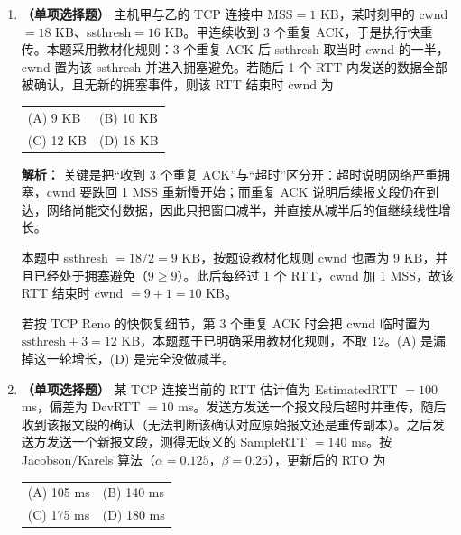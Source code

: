 \begin{enumerate}
\ifshowsolutions\par\noindent\textbf{解析：} 逐项辨析：
(A) 错。服务器收到 SYN 后发回 SYN+ACK 并进入 \texttt{SYN-RCVD}，只有收到第三次握手的 ACK 才进入 \texttt{ESTABLISHED}。
(B) 错。主动关闭方发出 FIN 后进入 \texttt{FIN-WAIT-1}，收到对方的 ACK 后才进入 \texttt{FIN-WAIT-2}。
(C) 对。第三次握手的报文段 ACK=1，此时客户端已认为连接建立，可以携带数据；数据字节按字节消耗序号（若只发纯 ACK，则不消耗序号）。
(D) 错。\texttt{TIME-WAIT} 由\textbf{主动}关闭方在发出最后一个 ACK 后进入，等待 2MSL；被动关闭方发出 FIN 后进入 \texttt{LAST-ACK}，收到 ACK 即进入 \texttt{CLOSED}。\else \answerarea \fi

\item \textbf{（单项选择题）} 主机甲与乙的 TCP 连接中 MSS$=1$ KB，某时刻甲的 cwnd$=18$ KB、ssthresh$=16$ KB。甲连续收到 3 个重复 ACK，于是执行快重传。本题采用教材化规则：3 个重复 ACK 后 ssthresh 取当时 cwnd 的一半，cwnd 置为该 ssthresh 并进入拥塞避免。若随后 1 个 RTT 内发送的数据全部被确认，且无新的拥塞事件，则该 RTT 结束时 cwnd 为
\begin{center}
\begin{tabular}{ll}
(A) 9 KB & (B) 10 KB \\[4pt]
(C) 12 KB & (D) 18 KB
\end{tabular}
\end{center}

\ifshowsolutions\par\noindent\textbf{解析：} 关键是把“收到 3 个重复 ACK”与“超时”区分开：超时说明网络严重拥塞，cwnd 要跌回 1 MSS 重新慢开始；而重复 ACK 说明后续报文段仍在到达，网络尚能交付数据，因此只把窗口减半，并直接从减半后的值继续线性增长。

本题中 ssthresh $=18/2=9$ KB，按题设教材化规则 cwnd 也置为 9 KB，并且已经处于拥塞避免（$9\geqslant 9$）。此后每经过 1 个 RTT，cwnd 加 1 MSS，故该 RTT 结束时 cwnd $=9+1=10$ KB。

若按 TCP Reno 的快恢复细节，第 3 个重复 ACK 时会把 cwnd 临时置为 $\text{ssthresh}+3=12$ KB，本题题干已明确采用教材化规则，不取 12。(A) 是漏掉这一轮增长，(D) 是完全没做减半。\else \answerarea \fi

\item \textbf{（单项选择题）} 某 TCP 连接当前的 RTT 估计值为 EstimatedRTT $=100$ ms，偏差为 DevRTT $=10$ ms。发送方发送一个报文段后超时并重传，随后收到该报文段的确认（无法判断该确认对应原始报文还是重传副本）。之后发送方发送一个新报文段，测得无歧义的 SampleRTT $=140$ ms。按 Jacobson/Karels 算法（$\alpha=0.125$，$\beta=0.25$），更新后的 RTO 为
\begin{center}
\begin{tabular}{ll}
(A) 105 ms & (B) 140 ms \\[4pt]
(C) 175 ms & (D) 180 ms
\end{tabular}
\end{center}


\end{enumerate}
